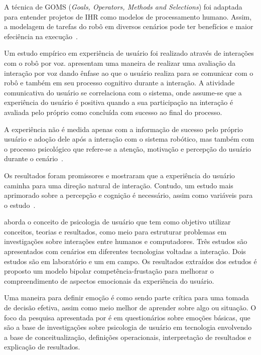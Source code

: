 A técnica de GOMS (\emph{Goals, Operators, Methods and Selections}) foi adaptada para entender projetos de IHR como modelos de processamento humano. Assim, a modelagem de tarefas do robô em diversos cenários pode ter benefícios e maior efeciência na execução~\cite{drury:2007}.

Um estudo empírico em experiência de usuário foi realizado através de interações com o robô por voz.  apresentam uma maneira de realizar uma avaliação da interação por voz dando ênfase ao que o usuário realiza para se comunicar com o robô e também em seu processo cognitivo durante a interação. A atividade comunicativa do usuário se correlaciona com o sistema, onde assume-se que a experiência do usuário é positiva quando a sua participação na interação é avaliada pelo próprio como concluída com sucesso ao final do processo.

A experiência não é medida apenas com a informação de sucesso pelo próprio usuário e adoção dele após a interação com o sistema robótico, mas também com o processo psicológico que refere-se a atenção, motivação e percepção do usuário durante o cenário~\cite{jokinen:2013}.

Os resultados foram promissores e mostraram que a experiência do usuário caminha para uma direção natural de interação. Contudo, um estudo mais aprimorado sobre a percepção e cognição é necessário, assim como variáveis para o estudo~\cite{jokinen:2013}.

 aborda o conceito de psicologia de usuário que tem como objetivo utilizar conceitos, teorias e resultados, como meio para estruturar problemas em investigações sobre interações entre humanos e computadores. Três estudos são apresentados com cenários em diferentes tecnologias voltadas a interação. Dois estudos são em laboratório e um em campo. Os resultados extraídos dos estudos é proposto um modelo bipolar competência-frustação para melhorar o compreendimento de aspectos emocionais da experiência do usuário.

Uma maneira para definir emoção é como sendo parte crítica para uma tomada de decisão efetiva, assim como meio melhor de aprender sobre algo ou situação. O foco da pesquisa apresentada por  é em questionários sobre emoções básicas, que são a base de investigações sobre psicologia de usuário em tecnologia envolvendo a base de conceitualização, definições operacionais, interpretação de resultados e explicação de resultados.

